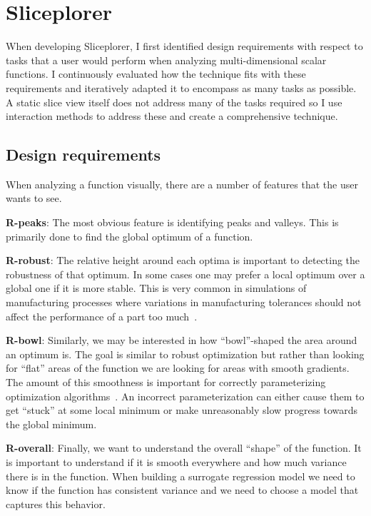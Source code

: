 \section{Sliceplorer}

When developing Sliceplorer, I first identified design requirements with
respect to tasks that a user would perform when analyzing multi-dimensional
scalar functions. I continuously evaluated how the technique fits with these
requirements and iteratively adapted it to encompass as many tasks as possible.
A static slice view itself does not address many of the tasks required so I
use interaction methods to address these and create a comprehensive technique.  

\subsection{Design requirements}

When analyzing a function visually, there are a number of features that the
user wants to see.

\textbf{R-peaks}: The most obvious feature
is identifying peaks and valleys. This is primarily done to find the
global optimum of a function. 

\textbf{R-robust}: The relative height
around each optima is important to detecting the robustness of that optimum. In
some cases one may prefer a local optimum over a global one if it is more stable.
This is very common in
simulations of manufacturing processes where variations in manufacturing tolerances
should not affect the performance of a part too much~\cite{Berger:2011}.  

\textbf{R-bowl}: Similarly, we may be
interested in how ``bowl''-shaped the area around an optimum is. The goal is
similar to robust optimization but rather than looking for ``flat'' areas of
the function we are looking for areas with smooth gradients. The amount of this
smoothness is important for correctly parameterizing optimization
algorithms~\cite{Back:1996}. An incorrect parameterization can either cause them to
get ``stuck'' at some local minimum or make unreasonably slow progress towards
the global minimum. 

\textbf{R-overall}: Finally, we want to understand the overall ``shape'' of the
function. It is important to understand if it is smooth everywhere and how much
variance there is in the function. When building a surrogate regression model
we need to know if the function has consistent variance and we need to choose a
model that captures this behavior. 

